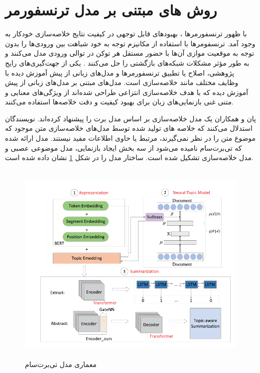 \section{روش ‌های مبتنی بر مدل ترنسفورمر‌}
با ظهور ترنسفورمرها
، بهبودهای قابل توجهی در کیفیت نتایج خلاصه‌سازی خودکار به وجود آمد. ترنسفومرها با استفاده از مکانیزم توجه به خود
شباهت بین ورودی‌ها را بدون توجه به موقعیت موازی آن‌ها با حضور مستقل هر توکن در توالی ورودی مدل می‌کنند و به طور مؤثر مشکلات شبکه‌های بازگشتی را حل می‌کنند
\cite{vaswani2017attention}
. یکی از جهت‌گیری‌های رایج پژوهشی، اصلاح یا تطبیق ترنسفورمرها و مدل‌های زبانی از پیش آموزش دیده با وظایف مختلف مانند خلاصه‌سازی است. مدل‌های مبتنی بر مدل‌های زبانی از پیش آموزش دیده که با هدف خلاصه‌سازی انتزاعی طراحی شده‌اند از ویژگی‌های معنایی و متنی غنی بازنمایی‌های زبان برای بهبود کیفیت و دقت خلاصه‌‌ها استفاده می‌کنند.



پان
و همکاران یک مدل خلاصه‌سازی بر اساس مدل برت را پیشنهاد کرده‌اند. نویسندگان استدلال می‌کنند که خلاصه های تولید شده توسط مدل‌های خلاصه‌سازی متن موجود که موضوع متن را در نظر نمی‌گیرند، مرتبط یا حاوی اطلاعات مفید نیستند. 
مدل ارائه شده که تی‌برت‌سام
نامیده می‌شود از سه بخش ایجاد بازنمایی، مدل موضوعی عصبی
و مدل خلاصه‌سازی تشکیل شده است. ساختار مدل را در شکل \ref{fig:tBert_model} نشان داده شده است.
\begin{figure}[!h]
	\begin{center}
		\includegraphics[height=10cm]{tbertsum_framework.png}
	\end{center}
	\caption{معماری مدل تی‌برت‌سام \cite{Ma2022TBERTSumTT}}
	\label{fig:tBert_model}
	\medskip
	\small
\end{figure}




